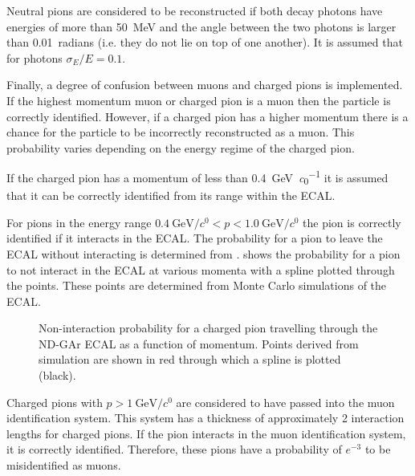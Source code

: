 Neutral pions are considered to be reconstructed if both decay photons have energies of more than \SI{50}{\MeV} and the angle between the two photons is larger than 0.01~radians (i.e. they do not lie on top of one another).
It is assumed that for photons $\sigma_{E}/E = 0.1$.

Finally, a degree of confusion between muons and charged pions is implemented.
If the highest momentum muon or charged pion is a muon then the particle is correctly identified.
However, if a charged pion has a higher momentum there is a chance for the particle to be incorrectly reconstructed as a muon.
This probability varies depending on the energy regime of the charged pion.

If the charged pion has a momentum of less than \SI{0.4}{\GeV\per\clight} it is assumed that it can be correctly identified from its range within the ECAL.

For pions in the energy range $\SI{0.4}{\GeV\per\clight} < p < \SI{1.0}{\GeV\per\clight}$ the pion is correctly identified if it interacts in the ECAL.
The probability for a pion to leave the ECAL without interacting is determined from .
 shows the probability for a pion to not interact in the ECAL at various momenta with a spline plotted through the points.
These points are determined from Monte Carlo simulations of the ECAL.

\begin{figure}[h]
	\centering
	\begin{adjustbox}{max totalsize=.6\linewidth, center}
		
	\end{adjustbox}
	\caption[Non-interaction probability for a charged pion travelling through the ND-GAr ECAL as a function of momentum]{Non-interaction probability for a charged pion travelling through the ND-GAr ECAL as a function of momentum. Points derived from simulation are shown in red through which a spline is plotted (black).}
	\label{fig:interactionSpline}
\end{figure}

Charged pions with $p>\SI{1}{\GeV\per\clight}$ are considered to have passed into the muon identification system. 
This system has a thickness of approximately 2 interaction lengths for charged pions.
If the pion interacts in the muon identification system, it is correctly identified.
Therefore, these pions have a probability of $e^{-3}$ to be misidentified as muons.

